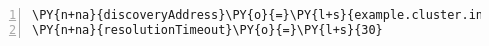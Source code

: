 \begin{Verbatim}[commandchars=\\\{\},numbers=left,firstnumber=1,stepnumber=1,frame=single]
\PY{n+na}{discoveryAddress}\PY{o}{=}\PY{l+s}{example.cluster.internal}
\PY{n+na}{resolutionTimeout}\PY{o}{=}\PY{l+s}{30}
\end{Verbatim}
